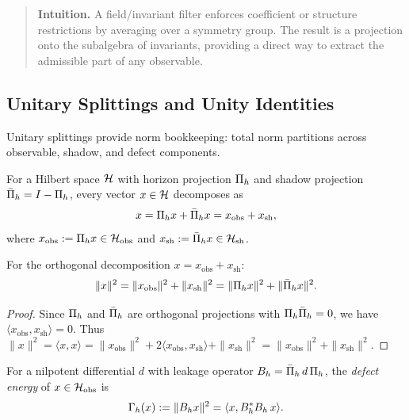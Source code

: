 \begin{quote}\small
\textbf{Intuition.}
A field/invariant filter enforces coefficient or structure restrictions by averaging over a symmetry group.
The result is a projection onto the subalgebra of invariants, providing a
direct way to extract the admissible part of any observable.
\end{quote}

\subsection{Unitary Splittings and Unity Identities}
\label{subsec:unity-splitting}

Unitary splittings provide norm bookkeeping: total norm partitions across observable, shadow, and defect components.

\begin{definition}
\label{def:obs-shadow-decomp}
For a Hilbert space $\cH$ with horizon projection $\CCPi{h}$ and shadow projection $\CCPibar{h} = I - \CCPi{h}$, every vector $x \in \cH$ decomposes as
\[
x = \CCPi{h} x + \CCPibar{h} x = x_{\mathrm{obs}} + x_{\mathrm{sh}},
\]
where $x_{\mathrm{obs}} := \CCPi{h} x \in \cH_{\mathrm{obs}}$ and $x_{\mathrm{sh}} := \CCPibar{h} x \in \cH_{\mathrm{sh}}$.
\end{definition}

\begin{proposition}
\label{prop:pythagorean-norm}
For the orthogonal decomposition $x = x_{\mathrm{obs}} + x_{\mathrm{sh}}$:
\[
\|x\|^2 = \|x_{\mathrm{obs}}\|^2 + \|x_{\mathrm{sh}}\|^2 = \|\CCPi{h} x\|^2 + \|\CCPibar{h} x\|^2.
\]
\end{proposition}

\begin{proof}
Since $\CCPi{h}$ and $\CCPibar{h}$ are orthogonal projections with $\CCPi{h} \CCPibar{h} = 0$, we have $\langle x_{\mathrm{obs}}, x_{\mathrm{sh}} \rangle = 0$.
Thus $\|x\|^2 = \langle x, x \rangle = \|x_{\mathrm{obs}}\|^2 + 2\langle x_{\mathrm{obs}}, x_{\mathrm{sh}} \rangle + \|x_{\mathrm{sh}}\|^2 = \|x_{\mathrm{obs}}\|^2 + \|x_{\mathrm{sh}}\|^2$.
\end{proof}

\begin{definition}
\label{def:defect-energy-unity}
For a nilpotent differential $d$ with leakage operator $\CCLeak{d}{h} = \CCLeakExpr{d}{h}$, the \emph{defect energy} of $x \in \cH_{\mathrm{obs}}$ is
\[
\CCDefEnergy{h}{x} := \|\CCLeak{d}{h} x\|^2 = \langle x, \CCLeak{d}{h}^\ast \CCLeak{d}{h}\, x \rangle.
\]
\end{definition}

